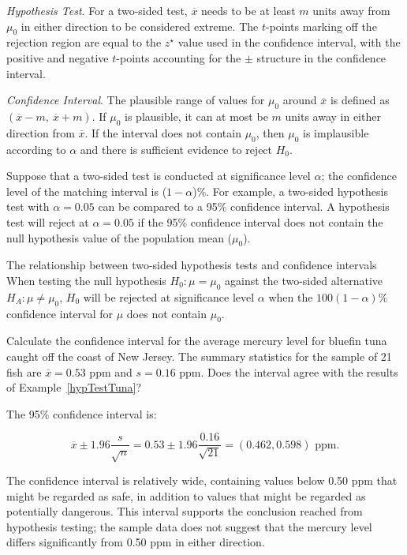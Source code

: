 \begin{list}{}{}
	\item \textit{Hypothesis Test}. For a two-sided test,  $\overline{x}$ needs to be at least $m$ units away from $\mu_0$ in either direction to be considered extreme. The $t$-points marking off the rejection region are equal to the $z^\star$ value used in the confidence interval, with the positive and negative $t$-points accounting for the $\pm$ structure in the confidence interval.
	
	\item \textit{Confidence Interval}. The plausible range of values for $\mu_0$ around $\overline{x}$ is defined as $(\overline{x} - m, \ \overline{x} + m)$. If $\mu_0$ is plausible, it can at most be $m$ units away in either direction from $\overline{x}$. If the interval does not contain $\mu_0$, then $\mu_0$ is implausible according to $\alpha$ and there is sufficient evidence to reject $H_0$.
\end{list}

\textD{\newpage}

Suppose that a two-sided test is conducted at significance level $\alpha$; the confidence level of the matching interval is ($1 - \alpha$)\%. For example, a two-sided hypothesis test with $\alpha = 0.05$ can be compared to a 95\% confidence interval. A hypothesis test will reject at $\alpha = 0.05$ if the 95\% confidence interval does not contain the null hypothesis value of the population mean ($\mu_0$).

\begin{onebox}{The relationship between two-sided hypothesis tests and confidence intervals}
When testing the null hypothesis $H_0:\mu = \mu_0$ against the two-sided alternative $H_A: \mu \neq \mu_0$, $H_0$ will be rejected at significance level $\alpha$ when the $100(1-\alpha)\%$ confidence interval for $\mu$ does not contain $\mu_0$.
\end{onebox}

\begin{examplewrap}
\begin{nexample}{Calculate the confidence interval for the average mercury level for bluefin tuna caught off the coast of New Jersey. The summary statistics for the sample of 21 fish are $\overline{x} = 0.53$ ppm and $s = 0.16$ ppm. Does the interval agree with the results of Example~\ref{hypTestTuna}?}

The 95\% confidence interval is: 

\[\overline{x} \pm 1.96 \dfrac{s}{\sqrt{n}}= 0.53 \pm 1.96 \frac{0.16}{\sqrt{21}} = (0.462, 0.598) \text{ ppm}.\]

The confidence interval is relatively wide, containing values below 0.50 ppm that might be regarded as safe, in addition to values that might be regarded as potentially dangerous. This interval supports the conclusion reached from hypothesis testing; the sample data does not suggest that the mercury level differs significantly from 0.50 ppm in either direction. 
\end{nexample}
\end{examplewrap}
	
